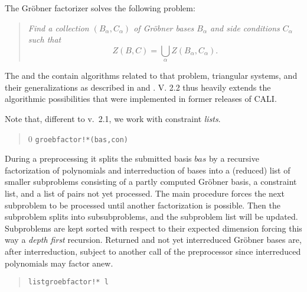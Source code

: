 The Gr\"obner factorizer solves the following problem:
\begin{quote}
\it Find a collection $(B_\alpha,C_\alpha)$ of Gr\"obner bases $B_\alpha$
and side conditions $C_\alpha$ such that
\[Z(B,C) = \bigcup_\alpha Z(B_\alpha,C_\alpha).\]
\end{quote}
The  and the  contain algorithms
related to that problem, triangular systems, and their generalizations
as described in \cite{Graebe:94a} and \cite{Graebe:95b}. V. 2.2 thus heavily
extends the algorithmic possibilities that were implemented in former
releases of CALI.

Note that, different to v.\ 2.1, we work with constraint \emph{lists}.
\begin{quote}0
\verb|groebfactor!*(bas,con)|

\end{quote}
During a preprocessing it splits the submitted basis $bas$ by a
recursive factorization of polynomials and interreduction of bases
into a (reduced) list of smaller subproblems consisting of a partly
computed Gr\"obner basis, a constraint list, and a list of pairs not yet
processed. The main procedure forces the next subproblem to be
processed until another factorization is possible. Then the
subproblem splits into subsubproblems, and the subproblem list will
be updated. Subproblems are kept sorted with respect to their
expected dimension  forcing this way a \emph{depth first}
recursion.  Returned and not yet interreduced Gr\"obner bases are, after
interreduction, subject to another call of the preprocessor since
interreduced polynomials may factor anew.
\begin{quote}
\verb|listgroebfactor!* l|

\end{quote}
\medskip

